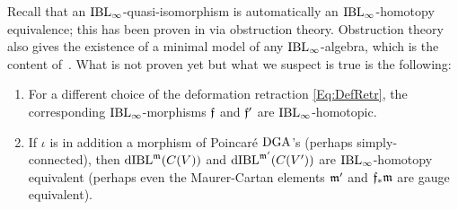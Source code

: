 \documentclass[\MainFolder/Text.tex]{subfiles}
\begin{document}
Recall that an $\mathrm{IBL}_\infty$-quasi-isomorphism is automatically an $\mathrm{IBL}_\infty$-homotopy equivalence; this has been proven in \cite[Theorem~1.2]{Cieliebak2015} via obstruction theory.
Obstruction theory also gives the existence of a minimal model of any $\mathrm{IBL}_\infty$-algebra, which is the content of~\cite[Theorem~1.3]{Cieliebak2015}.
What is not proven yet but what we suspect is true is the following:
\begin{enumerate}[label=(\arabic*)]
 \item For a different choice of the deformation retraction \eqref{Eq:DefRetr}, the corresponding $\mathrm{IBL}_\infty$-morphisms $\mathfrak{f}$ and $\mathfrak{f}'$ are $\mathrm{IBL}_\infty$-homotopic.
 \item If $\iota$ is in addition a morphism of Poincar\'e $\mathrm{DGA}$'s (perhaps simply-connected), then $\mathrm{dIBL}^{\mathfrak{m}}(C(V))$ and $\mathrm{dIBL}^{\mathfrak{m}'}(C(V'))$ are $\mathrm{IBL}_\infty$-homotopy equivalent (perhaps even the Maurer-Cartan elements $\mathfrak{m}'$ and $\mathfrak{f}_{*}\mathfrak{m}$ are gauge equivalent).
\end{enumerate}
\end{document}
